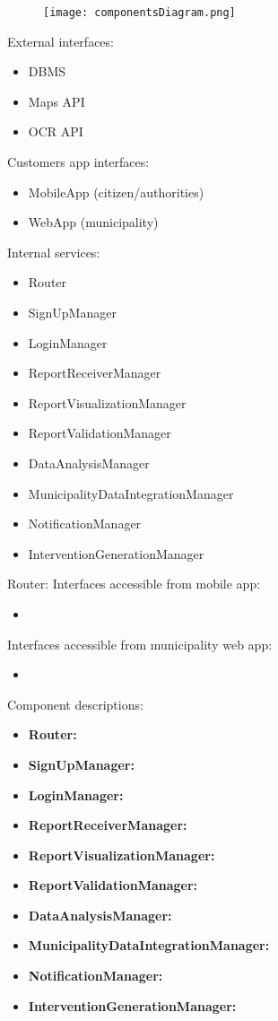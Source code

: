 \begin{figure}[H]
	\texttt{[image: componentsDiagram.png]}
\end{figure}

External interfaces:
\begin{itemize}
	\item DBMS
	\item Maps API
	\item OCR API
\end{itemize}

Customers app interfaces:
\begin{itemize}
	\item MobileApp (citizen/authorities)
	\item WebApp (municipality)
\end{itemize}

Internal services:
\begin{itemize}
	\item Router
	\item SignUpManager
	\item LoginManager
	\item ReportReceiverManager
	\item ReportVisualizationManager
	\item ReportValidationManager
	\item DataAnalysisManager
	\item MunicipalityDataIntegrationManager
	\item NotificationManager
	\item InterventionGenerationManager
\end{itemize}

Router:
Interfaces accessible from mobile app:
\begin{itemize}
	\item 
\end{itemize}
Interfaces accessible from municipality web app:
\begin{itemize}
	\item 
\end{itemize}

Component descriptions:
\begin{itemize}
	\item \textbf{Router:} 
	\item \textbf{SignUpManager:}
	\item \textbf{LoginManager:}
	\item \textbf{ReportReceiverManager:}
	\item \textbf{ReportVisualizationManager:}
	\item \textbf{ReportValidationManager:}
	\item \textbf{DataAnalysisManager:}
	\item \textbf{MunicipalityDataIntegrationManager:}
	\item \textbf{NotificationManager:}
	\item \textbf{InterventionGenerationManager:}
\end{itemize}